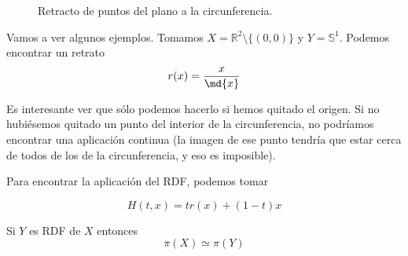 \documentclass{apuntes}
\begin{document}
\begin{figure}
\centering
{}
\caption{Retracto de puntos del plano a la circunferencia.}
\label{figRetractoCirc}
\end{figure}

Vamos a ver algunos ejemplos. Tomamos $X= ℝ^2\setminus \{(0,0)\}$ y $Y = \mathbb{S}^1$. Podemos encontrar un retrato \[ r(x) = \frac{x}{\md{x}}\]

Es interesante ver que sólo podemos hacerlo si hemos quitado el origen. Si no hubiésemos quitado un punto del interior de la circunferencia, no podríamos encontrar una aplicación continua (la imagen de ese punto tendría que estar cerca de todos de los de la circunferencia, y eso es imposible).

Para encontrar la aplicación del RDF, podemos tomar

\[ H(t,x) = t r(x) + (1-t)x\]

\begin{prop} Si $Y$ es RDF de $X$ entonces \[ π(X) \simeq π(Y) \] \label{propRDFIso}
\end{prop}
\end{document}
